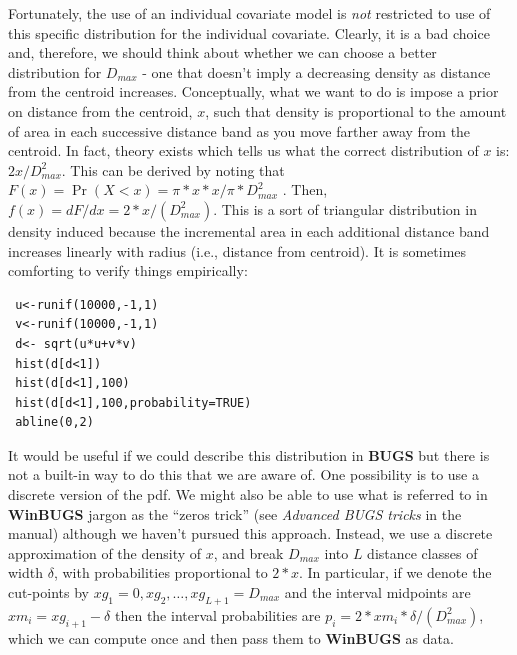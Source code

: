 Fortunately, the use of an individual covariate model is {\it not} restricted to
use of this specific distribution for the individual
covariate. Clearly, it is a bad choice and, therefore, we should think
about whether we can choose a better distribution for $D_{max}$ - one that
doesn't imply a decreasing density as distance from the centroid
increases.  Conceptually, what we want to do is impose a prior on
distance from the centroid, $x$, such that density is proportional to
the amount of area in each successive distance band as you move
farther away from the centroid.  In fact, theory exists
which tells us what the correct distribution of $x$ is:
$2x/D_{max}^2$. This can be derived by noting that $F(x) = \Pr(X<x) =
\pi*x*x/\pi*D_{max}^{2}$ . Then, $f(x) = dF/dx =
2*x/(D_{max}^{2})$. This is a sort of triangular distribution in
density
induced because the incremental area in each additional distance band
increases linearly with radius (i.e., distance from centroid). It is
sometimes comforting to verify things empirically:
{\small
\begin{verbatim}
 u<-runif(10000,-1,1)
 v<-runif(10000,-1,1)
 d<- sqrt(u*u+v*v)
 hist(d[d<1])
 hist(d[d<1],100)
 hist(d[d<1],100,probability=TRUE)
 abline(0,2)
\end{verbatim}
}

It would be useful if we could describe this distribution in {\bf
  BUGS} but there is not a built-in way to do this that we are aware
of.  One possibility is to use a discrete version of the pdf. We might
also be able to use what is referred to in {\bf WinBUGS} jargon as the
``zeros trick'' (see {\it Advanced BUGS tricks} in the manual)
although we haven't pursued this approach. Instead, we use a discrete
approximation of the density of $x$, and break $D_{max}$ into $L$
distance classes of width $\delta$, with probabilities proportional to
$2*x$. In particular, if we denote the cut-points by $xg_{1}=0,xg_{2},
\ldots, xg_{L+1}=D_{max}$ and the interval midpoints are $xm_{i} =
xg_{i+1}-\delta$ then the interval probabilities are $p_{i} =
2*xm_{i}*\delta/(D_{max}^{2})$, which we can compute once and then
pass them to {\bf WinBUGS} as data.

